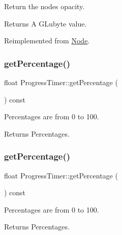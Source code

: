 Return the node\textquotesingle{}s opacity. \begin{DoxyReturn}{Returns}
A G\+Lubyte value. 
\end{DoxyReturn}


Reimplemented from \hyperlink{classNode_ab999cce3763ea09e74014245c770ea97}{Node}.

\mbox{\label{classProgressTimer_a446b52a689c8ea0f556f3c1b12eda7b8}} 
\subsubsection{\texorpdfstring{get\+Percentage()}{getPercentage()}\hspace{0.1cm}{\footnotesize\ttfamily [1/2]}}
{\footnotesize\ttfamily float Progress\+Timer\+::get\+Percentage (\begin{DoxyParamCaption}{ }\end{DoxyParamCaption}) const\hspace{0.3cm}{\ttfamily [inline]}}

Percentages are from 0 to 100.

\begin{DoxyReturn}{Returns}
Percentages. 
\end{DoxyReturn}
\mbox{\label{classProgressTimer_a446b52a689c8ea0f556f3c1b12eda7b8}} 
\subsubsection{\texorpdfstring{get\+Percentage()}{getPercentage()}\hspace{0.1cm}{\footnotesize\ttfamily [2/2]}}
{\footnotesize\ttfamily float Progress\+Timer\+::get\+Percentage (\begin{DoxyParamCaption}{ }\end{DoxyParamCaption}) const\hspace{0.3cm}{\ttfamily [inline]}}

Percentages are from 0 to 100.

\begin{DoxyReturn}{Returns}
Percentages. 
\end{DoxyReturn}
\mbox{\label{classProgressTimer_abf78b31860b22109143633f44508233f}} 
